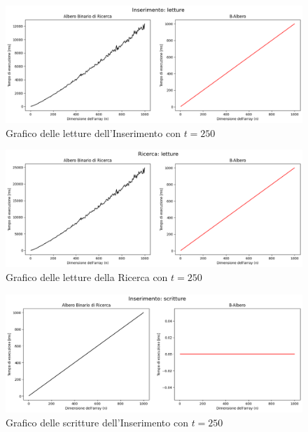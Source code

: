 \begin{figure}[H]
    \centering
    \includegraphics[width=\textwidth]{side-graphs/insert-r-t250.png}
    \caption{Grafico delle letture dell'Inserimento con $t=250$}
    \label{fig:sidegraphinsertread250}
\end{figure}
    
\begin{figure}[H]
    \centering
    \includegraphics[width=\textwidth]{side-graphs/search-r-t250.png}
    \caption{Grafico delle letture della Ricerca con $t=250$}
    \label{fig:sidegraphsearchread250}
\end{figure}

\begin{figure}[H]
    \centering
    \includegraphics[width=\textwidth]{side-graphs/insert-w-t250.png}
    \caption{Grafico delle scritture dell'Inserimento con $t=250$}
    \label{fig:sidegraphinsertwrite250}
\end{figure}
    
